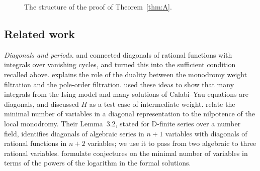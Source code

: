 \documentclass[11pt]{amsart}
\theoremstyle{definition}
\theoremstyle{remark}
\numberwithin{equation}{section}
\newcommand{\PP}{\mathbb{P}}
\newcommand{\Fab}{F_{a,b}}
\begin{document}
\begin{figure}[ht]
\centering
{}
\caption{The structure of the proof of Theorem~\ref{thm:A}.}\label{fig:strategy}
\end{figure}

\subsection{Related work}
\emph{Diagonals and periods.} \citet{Christol1985} and \citet{Deligne1984} connected diagonals of rational functions with integrals over vanishing cycles, and \citet[Theorem~12]{Christol1990} turned this into the sufficient condition recalled above. \citet[\S4.2]{Christol2015} explains the role of the duality between the monodromy weight filtration and the pole-order filtration. \citet{BostanEtAl2013} used these ideas to show that many integrals from the Ising model and many solutions of Calabi--Yau equations are diagonals, and discussed $H$ as a test case of intermediate weight. \citet{HarderKramerMiller2025} relate the minimal number of variables in a diagonal representation to the nilpotence of the local monodromy. Their Lemma~3.2, stated for D-finite series over a number field, identifies diagonals of algebraic series in $n+1$ variables with diagonals of rational functions in $n+2$ variables; we use it to pass from two algebraic to three rational variables. \citet{HassaniMaillardZenine2025} formulate conjectures on the minimal number of variables in terms of the powers of the logarithm in the formal solutions.
\end{document}
